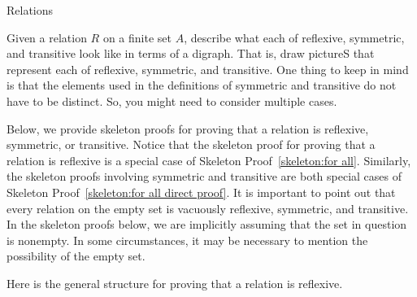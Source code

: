 \begin{section}{Relations}
%

\begin{problem}
Given a relation $R$ on a finite set $A$, describe what each of reflexive, symmetric, and transitive look like in terms of a digraph. That is, draw pictureS that represent each of reflexive, symmetric, and transitive. One thing to keep in mind is that the elements used in the definitions of symmetric and transitive do not have to be distinct.  So, you might need to consider multiple cases.
\end{problem}


Below, we provide skeleton proofs for proving that a relation is reflexive, symmetric, or transitive.  Notice that the skeleton proof for proving that a relation is reflexive is a special case of Skeleton Proof~\ref{skeleton:for all}. Similarly, the skeleton proofs involving symmetric and transitive are both special cases of Skeleton Proof~\ref{skeleton:for all direct proof}. It is important to point out that every relation on the empty set is vacuously reflexive, symmetric, and transitive.  In the skeleton proofs below, we are implicitly assuming that the set in question is nonempty.  In some circumstances, it may be necessary to mention the possibility of the empty set.

\begin{skeleton}
Here is the general structure for proving that a relation is reflexive. 
\begin{center}
\end{center}
\end{skeleton}


\end{section}
